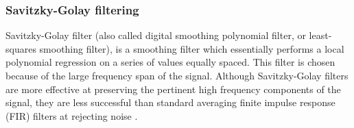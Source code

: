 \subsubsection{Savitzky-Golay filtering}

Savitzky-Golay filter (also called digital smoothing polynomial filter, or least-squares smoothing filter), is a smoothing filter which essentially performs a local polynomial regression on a series of values equally spaced. This filter is chosen because of the large frequency span of the signal. Although Savitzky-Golay filters are more effective at preserving the pertinent high frequency components of the signal, they are less successful than standard averaging finite impulse response (FIR) filters at rejecting noise \cite{signal_processing}.
